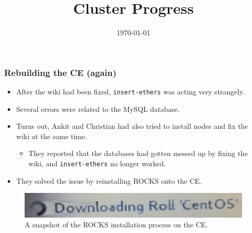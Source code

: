 \documentclass{beamer}
\title{Cluster Progress}
\date{\today}
\begin{document}

\begin{frame}
\titlepage
\end{frame}



\begin{frame}

  \frametitle{}
  
\end{frame}



\begin{frame}

  \frametitle{Rebuilding the CE (again)}

  \begin{itemize}
    \item After the wiki had been fixed, {\tt insert-ethers} was acting very
      strangely.
    \item Several errors were related to the MySQL database.
    \item Turns out, Ankit and Christian had also tried to install nodes and fix
      the wiki at the same time.
      \begin{itemize}
        \item They reported that the databases had gotten messed up by fixing
          the wiki, and {\tt insert-ethers} no longer worked.
      \end{itemize}
    \item They solved the issue by reinstalling ROCKS onto the CE.
  \end{itemize}

  \begin{figure}[H]
    \begin{center}
      \includegraphics[scale=0.1]{reinstall.JPG}
    \end{center}
    \caption{A snapshot of the ROCKS installation process on the CE.}
  \end{figure}

\end{frame}

\end{document}
